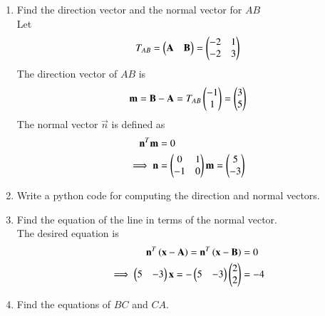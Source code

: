 \documentclass[journal,12pt,twocolumn]{IEEEtran}
\renewcommand\thesection{\arabic{section}}
\begin{document}
\begin{enumerate}[label=\thesection.\arabic*
,ref=\thesection.\theenumi]
\begin{align}
\\
&= -\myvec{2\\2}+ \lambda_1\myvec{3\\5}
\end{align}
%
\item Find the direction vector and the normal vector for $AB$
\\
\solution Let
\begin{align}
T_{AB} = \begin{pmatrix}\mathbf{A} & \mathbf{B}\end{pmatrix} = \begin{pmatrix}-2 & 1\\ -2 & 3\end{pmatrix}
\end{align}
The direction vector of $AB$ is 
\begin{equation}
\label{eq:dir_vec}
\mathbf{m} = \mathbf{B}-\mathbf{A} = T_{AB} \begin{pmatrix}-1 \\ 1\end{pmatrix} = \begin{pmatrix}3\\5\end{pmatrix}
\end{equation}
%
The normal vector $\vec{n}$ is defined as
\begin{align}
\label{eq:line_nor}
\mathbf{n}^T\mathbf{m} &= 0
\\
\implies \mathbf{n}&= \begin{pmatrix}0 & 1 \\ -1 & 0\end{pmatrix}\mathbf{m} = \begin{pmatrix}5\\-3\end{pmatrix}
\end{align}
%
\item Write a python code for computing the direction and normal vectors.
%
\label{prob:line_eq}


\item Find the equation of the line in terms of the normal 
vector.
\\
\solution The desired equation is
\begin{align}
\label{eq:line_norm}
\mathbf{n}^T\left(\mathbf{x} - \mathbf{A}\right)=\mathbf{n}^T\left(\mathbf{x} - \mathbf{B}\right)&= 0
\\
\implies \begin{pmatrix}5&-3\end{pmatrix}\mathbf{x} = -\begin{pmatrix}5&-3\end{pmatrix}\begin{pmatrix}2\\2\end{pmatrix} &= -4
\end{align}
%
\item
%
Find the equations of $BC$ and $CA$.
\end{enumerate}
\end{document}
